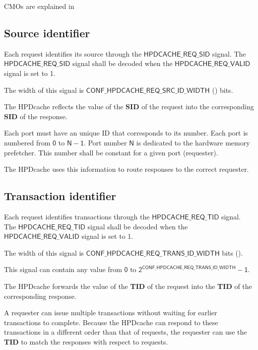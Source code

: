 \documentclass[10pt,titlepage,twoside]{book}
\begin{document}
\acfp{CMO} are explained in 


\subsection{Source identifier}

Each request identifies its source through the $\mathsf{HPDCACHE\_REQ\_SID}$ signal.
The $\mathsf{HPDCACHE\_REQ\_SID}$ signal shall be decoded when the $\mathsf{HPDCACHE\_REQ\_VALID}$ signal is set to 1.

The width of this signal is $\mathsf{CONF\_HPDCACHE\_REQ\_SRC\_ID\_WIDTH}$ () bits.

The \ac{HPDcache} reflects the value of the \textbf{SID} of the request into the corresponding \textbf{SID} of the response.

Each port must have an unique ID that corresponds to its number.
Each port is numbered from $\mathsf{0}$ to $\mathsf{N-1}$.
Port number $\mathsf{N}$ is dedicated to the hardware memory prefetcher.
This number shall be constant for a given port (requester).

The \ac{HPDcache} uses this information to route responses to the correct requester.


\subsection{Transaction identifier}

Each request identifies transactions through the $\mathsf{HPDCACHE\_REQ\_TID}$ signal.
The $\mathsf{HPDCACHE\_REQ\_TID}$ signal shall be decoded when the $\mathsf{HPDCACHE\_REQ\_VALID}$ signal is set to 1.

The width of this signal is $\mathsf{CONF\_HPDCACHE\_REQ\_TRANS\_ID\_WIDTH}$ bits ().

This signal can contain any value from $\mathsf{0}$ to $\mathsf{2^{CONF\_HPDCACHE\_REQ\_TRANS\_ID\_WIDTH} - 1}$.

The \ac{HPDcache} forwards the value of the \textbf{TID} of the request into the \textbf{TID} of the corresponding response.

A requester can issue multiple transactions without waiting for earlier transactions to complete.
Because the \ac{HPDcache} can respond to these transactions in a different order than that of requests, the requester can use the \textbf{TID} to match the responses with respect to requests.
\end{document}
